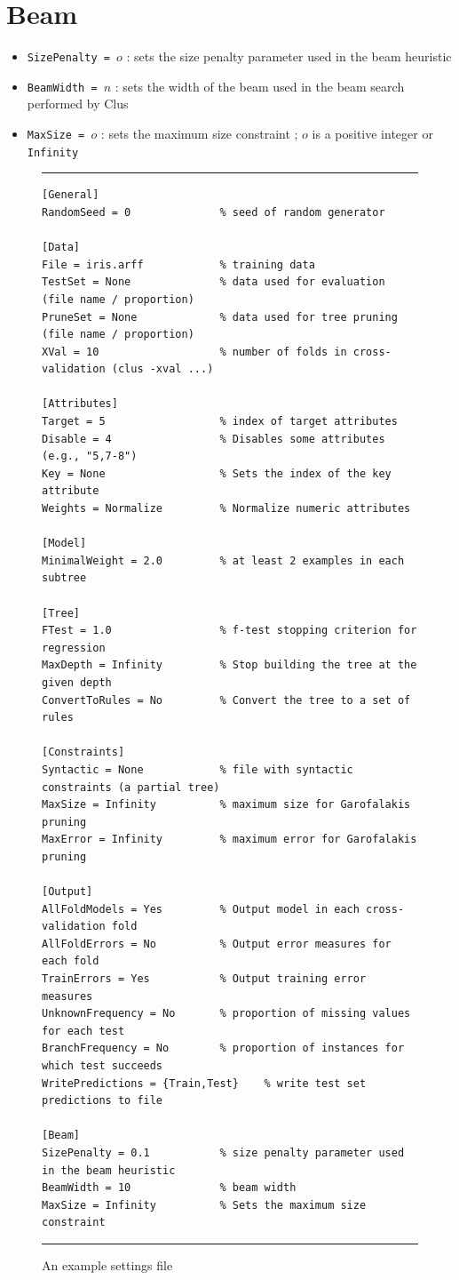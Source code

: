 \documentclass[a4paper]{report}
\begin{document}
\section{Beam}

\begin{itemize}
\item {\tt SizePenalty = $o$} : sets the size penalty parameter used in the beam heuristic \cite{Kocev07a:proc}
\item {\tt BeamWidth = $n$} : sets the width of the beam used in the beam search performed by Clus \cite{Kocev07a:proc}
\item {\tt MaxSize = $o$} : sets the maximum size constraint \cite{Kocev07a:proc}; $o$ is a positive integer or {\tt Infinity}
\end{itemize}

\begin{figure}
\hrule
\begin{verbatim}
[General]
RandomSeed = 0              % seed of random generator

[Data]
File = iris.arff            % training data
TestSet = None              % data used for evaluation (file name / proportion)
PruneSet = None             % data used for tree pruning (file name / proportion)
XVal = 10                   % number of folds in cross-validation (clus -xval ...)

[Attributes]
Target = 5                  % index of target attributes
Disable = 4                 % Disables some attributes (e.g., "5,7-8")
Key = None                  % Sets the index of the key attribute
Weights = Normalize         % Normalize numeric attributes

[Model]
MinimalWeight = 2.0         % at least 2 examples in each subtree
         
[Tree]
FTest = 1.0                 % f-test stopping criterion for regression
MaxDepth = Infinity         % Stop building the tree at the given depth
ConvertToRules = No         % Convert the tree to a set of rules

[Constraints]
Syntactic = None            % file with syntactic constraints (a partial tree)
MaxSize = Infinity          % maximum size for Garofalakis pruning
MaxError = Infinity         % maximum error for Garofalakis pruning

[Output]
AllFoldModels = Yes         % Output model in each cross-validation fold
AllFoldErrors = No          % Output error measures for each fold
TrainErrors = Yes           % Output training error measures
UnknownFrequency = No       % proportion of missing values for each test
BranchFrequency = No        % proportion of instances for which test succeeds
WritePredictions = {Train,Test}    % write test set predictions to file

[Beam]
SizePenalty = 0.1           % size penalty parameter used in the beam heuristic
BeamWidth = 10              % beam width
MaxSize = Infinity          % Sets the maximum size constraint
\end{verbatim}
\hrule
\caption{An example settings file}
\label{settings:fig}
\end{figure}
\end{document}
